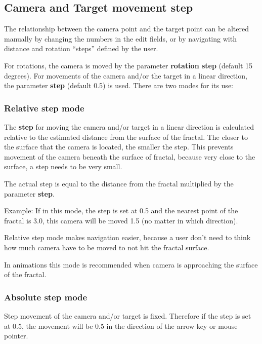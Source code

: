 \subsection{Camera and Target movement
	step}\label{camera-and-target-movement-step}

The relationship between the camera point and the target point can be altered
manually by changing the numbers in the edit fields, or by navigating with
distance and rotation ``steps'' defined by the user.

For rotations, the camera is moved by the parameter \textbf{rotation step}
(default 15 degrees). For movements of the camera and/or the target in a linear
direction, the parameter \textbf{step} (default 0.5) is used. There are two
modes for its use:

\subsubsection{Relative step mode}\label{relative-step-mode}

The \textbf{step} for moving the camera and/or target in a linear direction is
calculated relative to the estimated distance from the surface of the fractal.
The closer to the surface that the camera is located, the smaller the step. This
prevents movement of the camera beneath the surface of fractal, because very
close to the surface, a step needs to be very small.

The actual step is equal to the distance from the fractal multiplied by the
parameter \textbf{step}.

Example: If in this mode, the step is set at 0.5 and the nearest point of the
fractal is 3.0, this camera will be moved 1.5 (no matter in which direction).

Relative step mode makes navigation easier, because a user don't need to think
how much camera have to be moved to not hit the fractal surface.

In animations this mode is recommended when camera is approaching the surface of
the fractal.

\subsubsection{Absolute step mode}\label{absolute-step-mode}

Step movement of the camera and/or target is fixed. Therefore if the step is set
at 0.5, the movement will be 0.5 in the direction of the arrow key or mouse
pointer.

